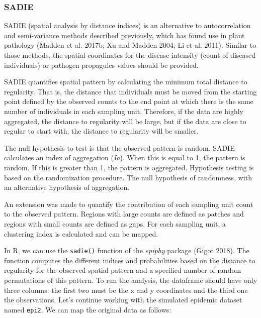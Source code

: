 \documentclass[
  letterpaper,
  DIV=11,
  numbers=noendperiod]{scrreprt}
\begin{document}
\hypertarget{sadie}{%
\subsubsection{SADIE}\label{sadie}}

SADIE (spatial analysis by distance indices) is an alternative to
autocorrelation and semi-variance methods described previously, which
has found use in plant pathology (Madden et al. 2017b; Xu and Madden
2004; Li et al. 2011). Similar to those methods, the spatial coordinates
for the disease intensity (count of diseased individuals) or pathogen
propagules values should be provided.

SADIE quantifies spatial pattern by calculating the minimum total
distance to regularity. That is, the distance that individuals must be
moved from the starting point defined by the observed counts to the end
point at which there is the same number of individuals in each sampling
unit. Therefore, if the data are highly aggregated, the distance to
regularity will be large, but if the data are close to regular to start
with, the distance to regularity will be smaller.

The null hypothesis to test is that the observed pattern is random.
SADIE calculates an index of aggregation (\emph{Ia}). When this is equal
to 1, the pattern is random. If this is greater than 1, the pattern is
aggregated. Hypothesis testing is based on the randomization procedure.
The null hypothesis of randomness, with an alternative hypothesis of
aggregation.

An extension was made to quantify the contribution of each sampling unit
count to the observed pattern. Regions with large counts are defined as
patches and regions with small counts are defined as gaps. For each
sampling unit, a clustering index is calculated and can be mapped.

In R, we can use the \texttt{sadie()} function of the \emph{epiphy}
package (Gigot 2018). The function computes the different indices and
probabilities based on the distance to regularity for the observed
spatial pattern and a specified number of random permutations of this
pattern. To run the analysis, the dataframe should have only three
columns: the first two must be the x and y coordinates and the third one
the observations. Let's continue working with the simulated epidemic
dataset named \texttt{epi2}. We can map the original data as follows:
\end{document}
